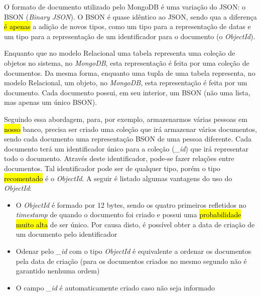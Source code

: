O formato de documento utilizado pelo MongoDB é uma variação do JSON: o BSON (\textit{Binary JSON}). O BSON é quase idêntico ao JSON, sendo qua a diferença \hl{é apenas} a adição de novos tipos, como um tipo para a representação de datas e um tipo para a representação de um identificador para o documento (o \textit{ObjectId}).


Enquanto que no modelo Relacional uma tabela representa uma coleção de objetos no sistema, no \textit{MongoDB}, esta representação é feita por uma coleção de documentos. Da mesma forma, enquanto uma tupla de uma tabela representa, no modelo Relacional, um objeto, no \textit{MongoDB}, esta representação é feita por um documento. Cada documento possui, em seu interior, um BSON (não uma lista, mas apenas um único BSON).
    
Seguindo essa abordagem, para, por exemplo, armazenarmos várias pessoas em \hl{nosso} banco, precisa ser criado uma coleção que irá armazenar vários documentos, sendo cada documento uma representação BSON de uma pessoa diferente. Cada documento terá um identificador único para a coleção (\textit{\_id}) que irá  representar todo o documento. Através deste identificador, pode-se fazer relações entre documentos. Tal identificador pode ser de qualquer tipo, porém o tipo \hl{recomentado} é o \textit{ObjectId}. A seguir é listado algumas vantagens do uso do \textit{ObjectId}:



\begin{itemize}
    \item O \textit{ObjectId} é formado por 12 bytes, sendo os quatro primeiros refletidos no \textit{timestamp} de quando o documento foi criado e possui uma \hl{probabilidade muito alta} de ser único. Por causa disto, é possível obter a data de criação de um documento pelo identificador
    
    \item Odenar pelo \textit{\_id} com o tipo \textit{ObjectId} é equivalente a ordenar os documentos pela data de criação (para os documentos criados no mesmo segundo não é garantido nenhuma ordem)
    
    \item O campo \textit{\_id} é automaticamente criado caso não seja informado
\end{itemize}

